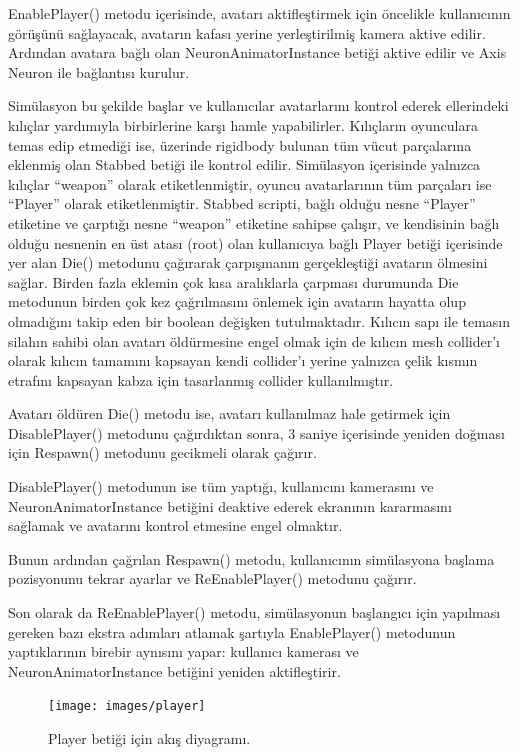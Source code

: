 \documentclass[a4paper, 12pt, titlepage]{article}
\begin{document}
EnablePlayer() metodu içerisinde, avatarı aktifleştirmek için öncelikle kullanıcının görüşünü
sağlayacak, avatarın kafası yerine yerleştirilmiş kamera aktive edilir. Ardından avatara bağlı olan
NeuronAnimatorInstance betiği aktive edilir ve Axis Neuron ile bağlantısı kurulur.

Simülasyon bu şekilde başlar ve kullanıcılar avatarlarını kontrol ederek ellerindeki kılıçlar
yardımıyla birbirlerine karşı hamle yapabilirler. Kılıçların oyunculara temas edip etmediği ise,
üzerinde rigidbody bulunan tüm vücut parçalarına eklenmiş olan Stabbed betiği ile kontrol edilir.
Simülasyon içerisinde yalnızca kılıçlar “weapon” olarak etiketlenmiştir, oyuncu avatarlarının tüm
parçaları ise “Player” olarak etiketlenmiştir. Stabbed scripti, bağlı olduğu nesne “Player”
etiketine ve çarptığı nesne “weapon” etiketine sahipse çalışır, ve kendisinin bağlı olduğu nesnenin
en üst atası (root) olan kullanıcıya bağlı Player betiği içerisinde yer alan Die() metodunu
çağırarak çarpışmanın gerçekleştiği avatarın ölmesini sağlar. Birden fazla eklemin çok kısa
aralıklarla çarpması durumunda Die metodunun birden çok kez çağrılmasını önlemek için avatarın
hayatta olup olmadığını takip eden bir boolean değişken tutulmaktadır. Kılıcın sapı ile temasın
silahın sahibi olan avatarı öldürmesine engel olmak için de kılıcın mesh collider’ı olarak kılıcın
tamamını kapsayan kendi collider’ı yerine yalnızca çelik kısmın etrafını kapsayan kabza için
tasarlanmış collider kullanılmıştır.

Avatarı öldüren Die() metodu ise, avatarı kullanılmaz hale getirmek için DisablePlayer() metodunu
çağırdıktan sonra, 3 saniye içerisinde yeniden doğması için Respawn() metodunu gecikmeli olarak
çağırır.

DisablePlayer() metodunun ise tüm yaptığı, kullanıcını kamerasını ve NeuronAnimatorInstance
betiğini deaktive ederek ekranının kararmasını sağlamak ve avatarını kontrol etmesine engel
olmaktır.

Bunun ardından çağrılan Respawn() metodu, kullanıcının simülasyona başlama pozisyonunu tekrar
ayarlar ve ReEnablePlayer() metodunu çağırır.

Son olarak da ReEnablePlayer() metodu, simülasyonun başlangıcı için yapılması gereken bazı ekstra
adımları atlamak şartıyla EnablePlayer() metodunun yaptıklarının birebir aynısını yapar: kullanıcı
kamerası ve NeuronAnimatorInstance betiğini yeniden aktifleştirir.
\newpage
\vfill

\begin{figure}[ht!]
    \centering
        \texttt{[image: images/player]}
    \caption{Player betiği için akış diyagramı.}
    \label{player}
\end{figure}
\end{document}

